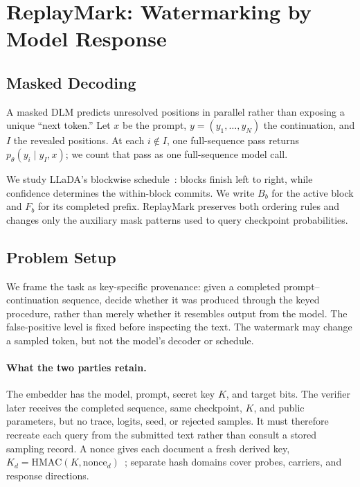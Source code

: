 \section{ReplayMark: Watermarking by Model Response}
\label{sec:method}

\subsection{Masked Decoding}
\label{sec:prelim}

A masked DLM predicts unresolved positions in parallel rather than exposing a unique ``next
token.'' Let $x$ be the prompt, $y=(y_1,\ldots,y_N)$ the continuation, and $I$ the revealed
positions. At each $i\notin I$, one full-sequence pass returns $p_\theta(y_i\mid y_I,x)$; we
count that pass as one full-sequence model call.

We study LLaDA's blockwise schedule~\citep{arriola2025blockdiffusion,nie2025llada}: blocks
finish left to right, while confidence determines the within-block commits. We write $B_b$ for
the active block and $F_b$ for its completed prefix. ReplayMark preserves both ordering rules and
changes only the auxiliary mask patterns used to query checkpoint probabilities.

\subsection{Problem Setup}
\label{sec:setup}

We frame the task as key-specific provenance: given a completed prompt--continuation sequence,
decide whether it was produced through the keyed procedure, rather than merely whether it resembles
output from the model. The false-positive level is fixed before inspecting the text. The watermark
may change a sampled token, but not the model's decoder or schedule.

\paragraph{What the two parties retain.}
The embedder has the model, prompt, secret key $K$, and target bits. The verifier later receives
the completed sequence, same checkpoint, $K$, and public parameters, but no trace, logits, seed,
or rejected samples. It must therefore recreate each query from the submitted text rather than
consult a stored sampling record. A nonce gives each document a fresh derived key,
$K_d=\mathrm{HMAC}(K,\mathrm{nonce}_d)$~\citep{bellare1996hmac}; separate hash domains cover
probes, carriers, and response directions.

